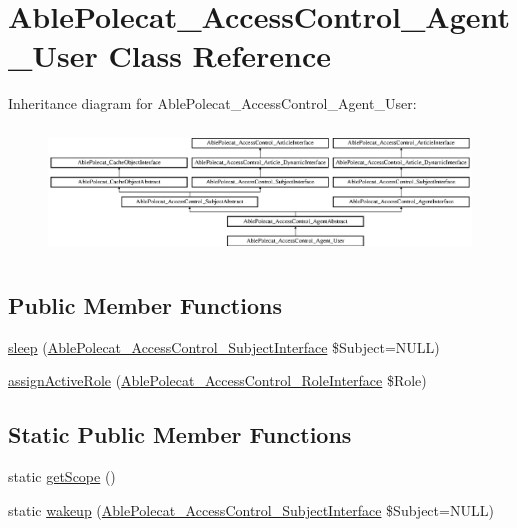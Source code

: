 \hypertarget{class_able_polecat___access_control___agent___user}{}\section{Able\+Polecat\+\_\+\+Access\+Control\+\_\+\+Agent\+\_\+\+User Class Reference}
\label{class_able_polecat___access_control___agent___user}
Inheritance diagram for Able\+Polecat\+\_\+\+Access\+Control\+\_\+\+Agent\+\_\+\+User\+:\begin{figure}[H]
\begin{center}
\leavevmode
\includegraphics[height=3.414634cm]{class_able_polecat___access_control___agent___user}
\end{center}
\end{figure}
\subsection*{Public Member Functions}
\begin{DoxyCompactItemize}
\item 
\hyperlink{class_able_polecat___access_control___agent___user_a365e24d7b066205cafa2a5cce3a4f224}{sleep} (\hyperlink{interface_able_polecat___access_control___subject_interface}{Able\+Polecat\+\_\+\+Access\+Control\+\_\+\+Subject\+Interface} \$Subject=N\+U\+L\+L)
\item 
\hyperlink{class_able_polecat___access_control___agent___user_aa20eaa314f35da6155b74a1f631393b8}{assign\+Active\+Role} (\hyperlink{interface_able_polecat___access_control___role_interface}{Able\+Polecat\+\_\+\+Access\+Control\+\_\+\+Role\+Interface} \$Role)
\end{DoxyCompactItemize}
\subsection*{Static Public Member Functions}
\begin{DoxyCompactItemize}
\item 
static \hyperlink{class_able_polecat___access_control___agent___user_ad9ade868bd136d32967059d1cccb3e92}{get\+Scope} ()
\item 
static \hyperlink{class_able_polecat___access_control___agent___user_a3f2135f6ad45f51d075657f6d20db2cd}{wakeup} (\hyperlink{interface_able_polecat___access_control___subject_interface}{Able\+Polecat\+\_\+\+Access\+Control\+\_\+\+Subject\+Interface} \$Subject=N\+U\+L\+L)
\end{DoxyCompactItemize}

